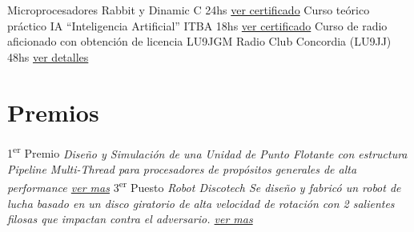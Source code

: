 \documentclass[11pt,a4paper,sans]{moderncv} 	%
\begin{document}
 		{Microprocesadores Rabbit y Dinamic C} 						{24hs}			 				{\href{http://disenioconingenio.com.ar/producto.php?products_id=386}{ver certificado}} 	{}{}
 		{Curso teórico práctico IA “Inteligencia Artificial”} 				{ITBA} 						{18hs} 	{\href{http://disenioconingenio.com.ar/producto.php?products_id=387}{ver certificado}} 	{}{}
 		{Curso de radio aficionado con obtención de licencia LU9JGM} 			{Radio Club Concordia (LU9JJ)} 			{48hs} 	{\href{http://disenioconingenio.com.ar/producto.php?products_id=388}{ver detalles}} 	{}{}
\section{Premios}
 					{1\textsuperscript{er} Premio} {}{}{\em{Diseño y Simulación de una Unidad de Punto Flotante con estructura Pipeline Multi-Thread para procesadores de propósitos generales de alta performance} \em \href{http://disenioconingenio.com.ar/shop/docs/i+d_itba_2002.pdf}{ver mas}}
	{3\textsuperscript{er} Puesto} {}{}{\em{Robot Discotech} \newline \em{Se diseño y fabricó un robot de lucha basado en un disco giratorio de alta velocidad de rotación con 2 salientes filosas que impactan contra el adversario. \href{http://disenioconingenio.com.ar/producto.php?products_id=378}{ver mas}}}
\end{document}
